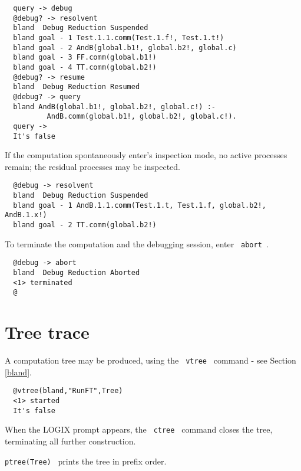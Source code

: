 \begin{verbatim}
  query -> debug
  @debug? -> resolvent
  bland  Debug Reduction Suspended
  bland goal - 1 Test.1.1.comm(Test.1.f!, Test.1.t!)
  bland goal - 2 AndB(global.b1!, global.b2!, global.c)
  bland goal - 3 FF.comm(global.b1!)
  bland goal - 4 TT.comm(global.b2!)
  @debug? -> resume
  bland  Debug Reduction Resumed
  @debug? -> query
  bland AndB(global.b1!, global.b2!, global.c!) :- 
          AndB.comm(global.b1!, global.b2!, global.c!).
  query -> 
  It's false
\end{verbatim}

\noindent
If the computation spontaneously enter's inspection mode,
no active processes remain; the residual processes may
be inspected.

\begin{verbatim}
  @debug -> resolvent
  bland  Debug Reduction Suspended
  bland goal - 1 AndB.1.1.comm(Test.1.t, Test.1.f, global.b2!, AndB.1.x!)
  bland goal - 2 TT.comm(global.b2!)
\end{verbatim}

\noindent
To terminate the computation and the debugging session,
enter \verb+ abort +.

\begin{verbatim}
  @debug -> abort
  bland  Debug Reduction Aborted
  <1> terminated
  @
\end{verbatim}

\section{Tree trace}
\label{vtree traces}

A computation tree may be produced, using the \verb+ vtree +
command - see Section \ref{bland}.

\begin{verbatim}
  @vtree(bland,"RunFT",Tree)
  <1> started
  It's false
\end{verbatim}

\noindent
When the LOGIX prompt appears,
the \verb+ ctree + command closes the tree, terminating
all further construction.

\noindent
\verb+ptree(Tree) + prints the tree in prefix order.

